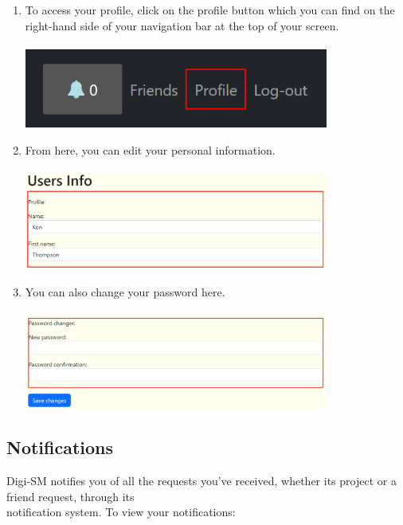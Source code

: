 \documentclass{article}
\begin{document}
\begin{enumerate}
    \item To access your profile, click on the profile button which you can find on the right-hand side of your navigation bar at the top of your screen.\\\\
    \includegraphics[width=10cm]{profileNav.png}
    \item From here, you can edit your personal information.\\\\
    \includegraphics[width=10cm]{personalInfo.png}
    \item You can also change your password here.\\\\
    \includegraphics[width=10cm]{password.png}
\end{enumerate}  

\newpage

\subsection{Notifications}

Digi-SM notifies you of all the requests you've received, whether its project or a friend request, through its\\ notification system. To view your notifications:
\end{document}
